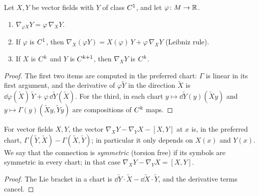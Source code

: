 \begin{proposition}
  \label{prop:conn-rules}
  \leanok
  Let $X, Y$ be vector fields with $Y$ of class $C^{1}$, and let $\varphi \colon M \to \mathbb{R}$.
  \begin{enumerate}
    \item $\nabla_{\varphi X} Y = \varphi\, \nabla_X Y$.
    \item If $\varphi$ is $C^{1}$, then $\nabla_X(\varphi Y) = X(\varphi)\, Y + \varphi\,\nabla_X Y$
    (Leibniz rule).
    \item If $X$ is $C^{k}$ and $Y$ is $C^{k+1}$, then $\nabla_X Y$ is $C^{k}$.
  \end{enumerate}
\end{proposition}

\begin{proof}
  \leanok
  The first two items are computed in the preferred chart: $\Gamma$ is linear in its first
  argument, and the derivative of $\varphi \tilde Y$ in the direction $\tilde X$ is
  $\dd\varphi(\tilde X)\,\tilde Y + \varphi\,\dd\tilde Y(\tilde X)$. For the third, in each chart
  $y \mapsto \dd\tilde Y(y)(\tilde X y)$ and $y \mapsto \Gamma(y)(\tilde X y, \tilde Y y)$ are
  compositions of $C^{k}$ maps.
\end{proof}

\begin{proposition}[Torsion]
  \label{prop:conn-torsion}
  \leanok
  For vector fields $X, Y$, the vector $\nabla_X Y - \nabla_Y X - [X, Y]$ at $x$ is, in the
  preferred chart, $\Gamma(\tilde Y, \tilde X) - \Gamma(\tilde X, \tilde Y)$; in particular it only
  depends on $X(x)$ and $Y(x)$. We say that the connection is \emph{symmetric} (torsion free) if
  its symbols are symmetric in every chart; in that case $\nabla_X Y - \nabla_Y X = [X, Y]$.
\end{proposition}

\begin{proof}
  \leanok
  The Lie bracket in a chart is $\dd\tilde Y \cdot \tilde X - \dd\tilde X \cdot \tilde Y$, and
  the derivative terms cancel.
\end{proof}

